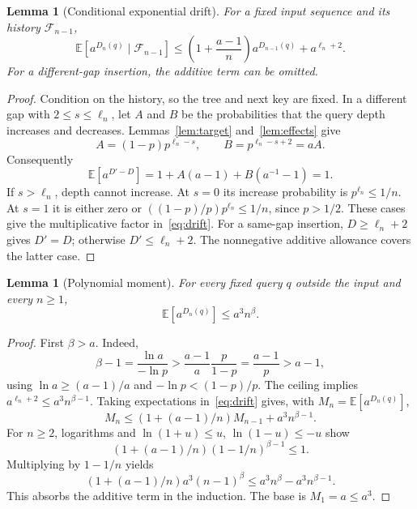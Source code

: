 \documentclass[11pt]{article}
\newtheorem{lemma}[theorem]{Lemma}
\newcommand{\E}{\mathbb E}
\begin{document}
\begin{lemma}[Conditional exponential drift]\label{lem:drift}
For a fixed input sequence and its history $\mathcal F_{n-1}$,
\begin{equation}
 \E[a^{D_n(q)}\mid\mathcal F_{n-1}]
 \le \left(1+\frac{a-1}{n}\right)a^{D_{n-1}(q)}+a^{\ell_n+2}.
                                                               \label{eq:drift}
\end{equation}
For a different-gap insertion, the additive term can be omitted.
\end{lemma}
\begin{proof}
Condition on the history, so the tree and next key are fixed. In a different
gap with $2\le s\le\ell_n$, let $A$ and $B$ be the probabilities that the query
depth increases and decreases. Lemmas~\ref{lem:target} and~\ref{lem:effects} give
\[
 A=(1-p)p^{\ell_n-s},\qquad B=p^{\ell_n-s+2}=aA.
\]
Consequently
\begin{equation}
 \E[a^{D'-D}]=1+A(a-1)+B(a^{-1}-1)=1.                         \label{eq:cancel}
\end{equation}
If $s>\ell_n$, depth cannot increase. At $s=0$ its increase probability is
$p^{\ell_n}\le1/n$. At $s=1$ it is either zero or
$((1-p)/p)p^{\ell_n}\le1/n$, since $p>1/2$. These cases give the
multiplicative factor in~\eqref{eq:drift}. For a same-gap insertion,
$D\ge\ell_n+2$ gives $D'=D$; otherwise $D'\le\ell_n+2$. The nonnegative
additive allowance covers the latter case.
\end{proof}

\begin{lemma}[Polynomial moment]\label{lem:moment}
For every fixed query $q$ outside the input and every $n\ge1$,
\begin{equation}
 \E[a^{D_n(q)}]\le a^3 n^\beta.                              \label{eq:moment}
\end{equation}
\end{lemma}
\begin{proof}
First $\beta>a$. Indeed,
\[
 \beta-1=\frac{\ln a}{-\ln p}
 >\frac{a-1}{a}\frac{p}{1-p}=\frac{a-1}{p}>a-1,
\]
using $\ln a\ge(a-1)/a$ and $-\ln p<(1-p)/p$.
The ceiling implies $a^{\ell_n+2}\le a^3n^{\beta-1}$. Taking expectations
in~\eqref{eq:drift} gives, with $M_n=\E[a^{D_n(q)}]$,
\[
 M_n\le(1+(a-1)/n)M_{n-1}+a^3n^{\beta-1}.
\]
For $n\ge2$, logarithms and $\ln(1+u)\le u$, $\ln(1-u)\le-u$ show
\[
 (1+(a-1)/n)(1-1/n)^{\beta-1}\le1.
\]
Multiplying by $1-1/n$ yields
\[
 (1+(a-1)/n)a^3(n-1)^\beta
 \le a^3n^\beta-a^3n^{\beta-1}.
\]
This absorbs the additive term in the induction. The base is $M_1=a\le a^3$.
\end{proof}
\end{document}
